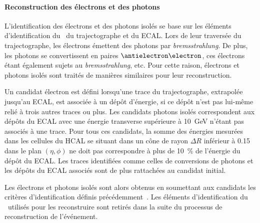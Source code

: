 \paragraph{Reconstruction des électrons et des photons}
L'identification des électrons et des photons isolés se base sur les éléments d'identification du \PF\ du trajectographe et du ECAL.
Lors de leur traversée du trajectographe, les électrons émettent des photons par \emph{bremsstrahlung}.
De plus, les photons se convertissent en paires $\antielectron\electron$, ces électrons étant également sujets au \emph{bremsstrahlung}, etc.
Pour cette raison, électrons et photons isolés sont traités de manières similaires pour leur reconstruction.
\par Un candidat électron est défini lorsqu'une trace du trajectographe, extrapolée jusqu'au ECAL, est associée à un dépôt d'énergie, si ce dépôt n'est pas lui-même relié à trois autres traces ou plus.
Les candidats photons isolés correspondent aux dépôts du ECAL avec une énergie transverse supérieure à \SI{10}{\GeV} n'étant pas associés à une trace.
Pour tous ces candidats, la somme des énergies mesurées dans les cellules du HCAL se situant dans un cône de rayon $\Delta R$ inférieur à \num{0.15} dans le plan $(\eta,\phi)$ ne doit pas correspondre à plus de \SI{10}{\%} de l'énergie du dépôt du ECAL.
Les traces identifiées comme celles de conversions de photons et les dépôts du ECAL associés sont de plus rattachées au candidat initial.
\par Les électrons et photons isolés sont alors obtenus en soumettant aux candidats les critères d'identification définis précédemment~\cite{particle-flow}.
Les éléments d'identification du \PF\ utilisés pour les reconstruire sont retirés dans la suite du processus de reconstruction de l'événement.
